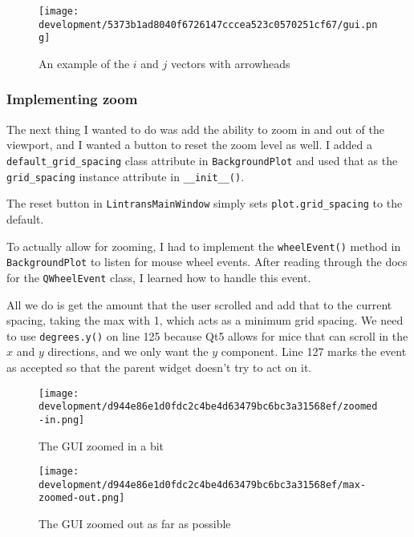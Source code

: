 \documentclass[../development.tex]{subfiles}
\begin{document}
\begin{figure}[H]
	\centering
	\texttt{[image: development/5373b1ad8040f6726147cccea523c0570251cf67/gui.png]}
	\caption{An example of the $i$ and $j$ vectors with arrowheads}
	\label{fig:development:5373b1ad8040f6726147cccea523c0570251cf67:gui.png}
\end{figure}

\subsubsection{Implementing zoom\label{development:improving-the-gui:implementing-zoom}}

The next thing I wanted to do was add the ability to zoom in and out of the viewport, and I wanted a button to reset the zoom level as well. I added a \texttt{default_grid_spacing} class attribute in \texttt{BackgroundPlot} and used that as the \texttt{grid_spacing} instance attribute in \texttt{__init__()}.


The reset button in \texttt{LintransMainWindow} simply sets \texttt{plot.grid_spacing} to the default.

To actually allow for zooming, I had to implement the \texttt{wheelEvent()} method in \texttt{BackgroundPlot} to listen for mouse wheel events. After reading through the docs for the \texttt{QWheelEvent} class\cite{qt5-docs-qwheelevent}, I learned how to handle this event.


All we do is get the amount that the user scrolled and add that to the current spacing, taking the max with 1, which acts as a minimum grid spacing. We need to use \texttt{degrees.y()} on line 125 because Qt5 allows for mice that can scroll in the $x$ and $y$ directions, and we only want the $y$ component. Line 127 marks the event as accepted so that the parent widget doesn't try to act on it.

\begin{figure}[H]
	\hspace{0.005\linewidth}
	\centering
	\begin{minipage}{0.48\linewidth}
		\centering
		\texttt{[image: development/d944e86e1d0fdc2c4be4d63479bc6bc3a31568ef/zoomed-in.png]}
		\caption{The GUI zoomed in a bit}
		\label{fig:development:d944e86e1d0fdc2c4be4d63479bc6bc3a31568ef:zoomed-in.png}
	\end{minipage}\hspace{0.015\linewidth}
	\begin{minipage}{0.48\linewidth}
		\centering
		\texttt{[image: development/d944e86e1d0fdc2c4be4d63479bc6bc3a31568ef/max-zoomed-out.png]}
		\caption{The GUI zoomed out as far as possible}
		\label{fig:development:d944e86e1d0fdc2c4be4d63479bc6bc3a31568ef:max-zoomed-out.png}
	\end{minipage}
	\hspace{0.005\linewidth}
	\vspace{-1em}
\end{figure}
\end{document}
